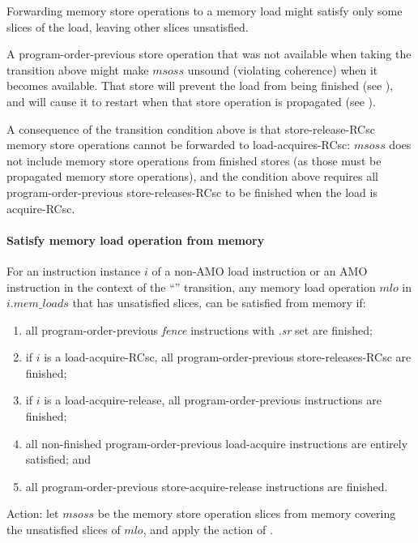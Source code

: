 \begin{commentary}
Forwarding memory store operations to a memory load might satisfy only some slices of the load, leaving other slices unsatisfied.

A program-order-previous store operation that was not available when taking the transition above might make $msoss$ unsound (violating coherence) when it becomes available.
That store will prevent the load from being finished (see ), and will cause it to restart when that store operation is propagated (see ).

A consequence of the transition condition above is that store-release-RCsc memory store operations cannot be forwarded to load-acquires-RCsc:
$msoss$ does not include memory store operations from finished stores (as those must be propagated memory store operations), and the condition above requires all program-order-previous store-releases-RCsc to be finished when the load is acquire-RCsc.
\end{commentary}


\paragraph{Satisfy memory load operation from memory}\label{omm:sat_from_mem}
For an instruction instance $i$ of a non-AMO load instruction or an AMO instruction in the context of the ``'' transition, any memory load operation $mlo$ in $i.\textit{mem\_loads}$ that has unsatisfied slices, can be satisfied from memory if:
\begin{enumerate}
\item all program-order-previous {\em fence} instructions with {\em .sr} set are finished;
\item if $i$ is a load-acquire-RCsc, all program-order-previous store-releases-RCsc are finished;
\item if $i$ is a load-acquire-release, all program-order-previous instructions are finished;
\item all non-finished program-order-previous load-acquire instructions are entirely satisfied; and
\item all program-order-previous store-acquire-release instructions are finished.
\end{enumerate}
Action: let $msoss$ be the memory store operation slices from memory covering the unsatisfied slices of $mlo$, and apply the action of .

